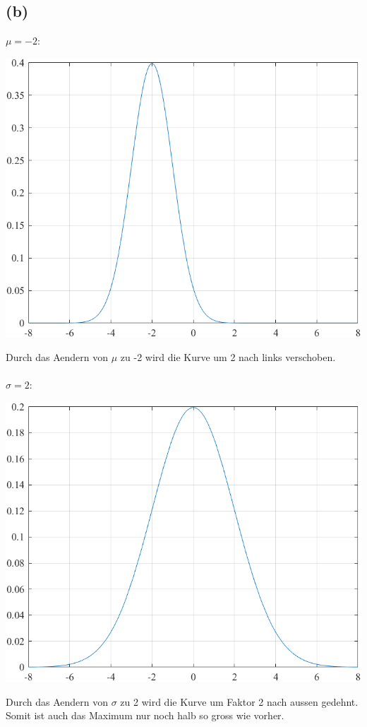 \documentclass[a4paper]{scrartcl}
\begin{document}
\subsection*{(b)}
$\mu = -2:$
\begin{center}
	\includegraphics*[scale = 0.5]{question2b1.png}
\end{center}
Durch das Aendern von $\mu$ zu -2 wird die Kurve um 2 nach links verschoben.\\ \ \\
$\sigma = 2:$
\begin{center}
	\includegraphics*[scale = 0.5]{question2b2.png}
\end{center}
Durch das Aendern von $\sigma$ zu 2 wird die Kurve um Faktor 2 nach aussen gedehnt. Somit ist auch das Maximum nur noch halb so gross wie vorher.\\
\end{document}
